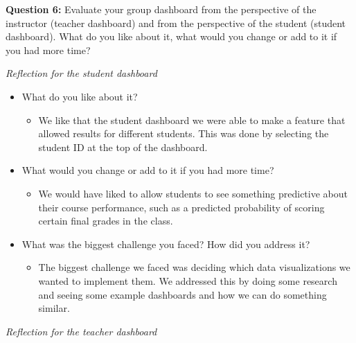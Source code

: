 \documentclass[
]{article}
\providecommand{\tightlist}{%
  \setlength{\itemsep}{0pt}\setlength{\parskip}{0pt}}
\begin{document}
\textbf{Question 6:} Evaluate your group dashboard from the perspective
of the instructor (teacher dashboard) and from the perspective of the
student (student dashboard). What do you like about it, what would you
change or add to it if you had more time?

\emph{Reflection for the student dashboard}

\begin{itemize}
\tightlist
\item
  What do you like about it?

  \begin{itemize}
  \tightlist
  \item
    We like that the student dashboard we were able to make a feature
    that allowed results for different students. This was done by
    selecting the student ID at the top of the dashboard.
  \end{itemize}
\item
  What would you change or add to it if you had more time?

  \begin{itemize}
  \tightlist
  \item
    We would have liked to allow students to see something predictive
    about their course performance, such as a predicted probability of
    scoring certain final grades in the class.
  \end{itemize}
\item
  What was the biggest challenge you faced? How did you address it?

  \begin{itemize}
  \tightlist
  \item
    The biggest challenge we faced was deciding which data
    visualizations we wanted to implement them. We addressed this by
    doing some research and seeing some example dashboards and how we
    can do something similar.
  \end{itemize}
\end{itemize}

\emph{Reflection for the teacher dashboard}
\end{document}
